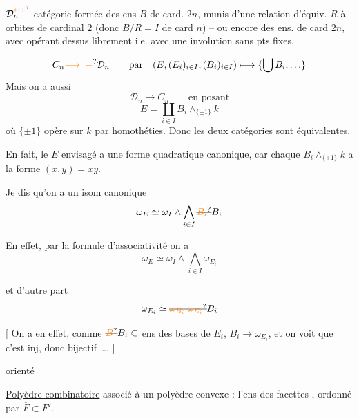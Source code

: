 $\mathcal D_n^{\unsure{*|+}}$ catégorie formée des ens $B$ de card. $2n$,
munis d'une relation d'équiv. $R$ à orbites
de cardinal $2$ (donc $B/R=I$ de card $n$)
-- ou encore des ens. de card $2n$, avec
  opérant dessus librement i.e. avec une
involution sans pts fixes.

\[
 C_n\unsure{\longrightarrow|-}\mathcal D_n\qquad\text{par}\quad
 (E,(E_i)_{i\in I},(B_i)_{i\in I})\longmapsto\{\bigcup B_i,\ldots\}
\]
Mais on a aussi
\[
 \mathcal D_n\longrightarrow C_n\qquad\text{en posant}
\]
\[
 E=\coprod_{i\in I}B_i\wedge_{\{\pm1\}}k
\]
où $\{\pm1\}$ opère sur $k$ par homothéties. Donc les
deux catégories sont équivalentes.

En fait, le $E$ envisagé a  une
forme quadratique canonique, car chaque
$B_i\wedge_{\{\pm1\}} k$ a la forme   $(x,y)=xy$.

Je dis qu'on a un isom canonique
\[
\omega_E\simeq\omega_I\wedge\bigwedge_{i\in I}\deleted{\unsure{B_i}} B_i
\]

En effet, par la formule d'associativité on a
\[
\omega_E\simeq\omega_I\wedge\bigwedge_{i\in I}\omega_{E_i}
\]

et d'autre part
\[
\omega_{E_i}\simeq\deleted{\unsure{\omega_{B_i}|\omega_{E_i}}} B_i
\]

[ On a en effet, comme $\deleted{\unsure{B}} B_i\subset$ ens des bases de $E_i$,
$B_i\longrightarrow\omega_{E_i}$, et on voit que c'est inj, donc
bijectif \ldots. ]

\uline{} 
\uline{orienté}

\uline{Polyèdre combinatoire} associé à un polyèdre convexe :
l'ens des facettes ,  ordonné par $\overline F\subset\overline{F'}$.

